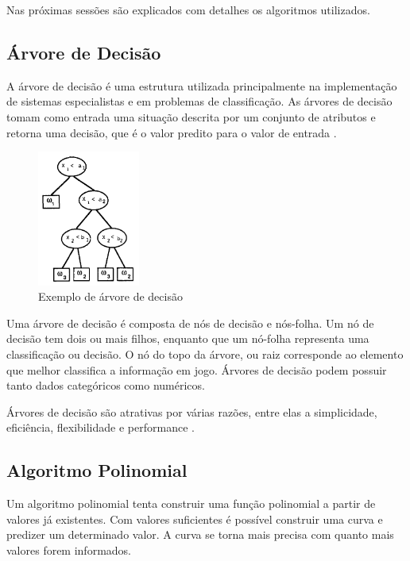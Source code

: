 \documentclass[12pt]{article}
\begin{document}
Nas próximas sessões são explicados com detalhes os algoritmos utilizados.

\subsection{Árvore de Decisão}\label{sec:arvorededecisao}
A árvore de decisão é uma estrutura utilizada principalmente na implementação de
sistemas especialistas e em problemas de classificação. As árvores de decisão
tomam como entrada uma situação descrita por um conjunto de atributos e retorna
uma decisão, que é o valor predito para o valor de entrada \cite{russell2003}.

\begin{figure}[h]
\centering
\includegraphics[width=0.3\textwidth]{arvorededecisao}
\caption{Exemplo de árvore de decisão \cite{safavian1991survey}}
\label{arvorededecisao}
\end{figure}

Uma árvore de decisão é composta de nós de decisão e nós-folha. Um nó de decisão
tem dois ou mais filhos, enquanto que um nó-folha representa uma classificação
ou decisão. O nó do topo da árvore, ou raiz corresponde ao elemento que melhor
classifica a informação em jogo. Árvores de decisão podem possuir tanto dados
categóricos como numéricos.

Árvores de decisão são atrativas por várias razões, entre elas a simplicidade,
eficiência, flexibilidade e performance \cite{safavian1991survey}.

\subsection{Algoritmo Polinomial}
Um algoritmo polinomial tenta construir uma função polinomial a partir de
valores já existentes. Com valores suficientes é possível construir uma curva
e predizer um determinado valor. A curva se torna mais precisa com quanto mais
valores forem informados.



%
\end{document}
